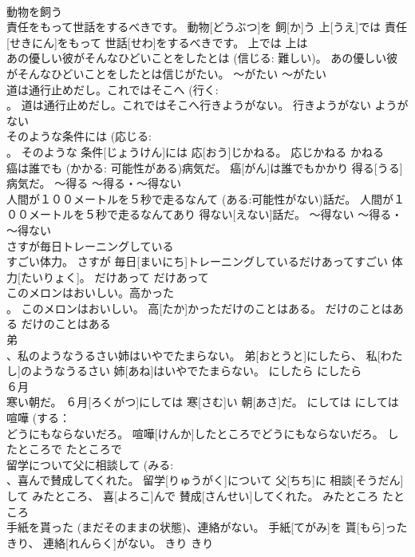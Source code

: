 \documentclass[8pt]{extreport}
\begin{document}
\begin{CJK}{UTF8}{min}
\\	動物を飼う 
\\	責任をもって世話をするべきです。	動物[どうぶつ]を 飼[か]う 上[うえ]では 責任[せきにん]をもって 世話[せわ]をするべきです。	上では	上は	
\\	あの優しい彼がそんなひどいことをしたとは (信じる: 難しい)。	あの優しい彼がそんなひどいことをしたとは信じがたい。	～がたい	～がたい	
\\	道は通行止めだし。これではそこへ (行く: 
\\	。	道は通行止めだし。これではそこへ行きようがない。	行きようがない	ようがない	
\\	そのような条件には (応じる: 
\\	。	そのような 条件[じょうけん]には 応[おう]じかねる。	応じかねる	かねる	
\\	癌は誰でも (かかる: 可能性がある)病気だ。	癌[がん]は誰でもかかり 得る[うる]病気だ。	～得る	～得る・～得ない	
\\	人間が１００メートルを５秒で走るなんて (ある:可能性がない)話だ。	人間が１００メートルを５秒で走るなんてあり 得ない[えない]話だ。	～得ない	～得る・～得ない	
\\	さすが毎日トレーニングしている 
\\	すごい体力。	さすが 毎日[まいにち]トレーニングしているだけあってすごい 体力[たいりょく]。	だけあって	だけあって	
\\	このメロンはおいしい。高かった 
\\	。	このメロンはおいしい。 高[たか]かっただけのことはある。	だけのことはある	だけのことはある	
\\	弟 
\\	、私のようなうるさい姉はいやでたまらない。	弟[おとうと]にしたら、 私[わたし]のようなうるさい 姉[あね]はいやでたまらない。	にしたら	にしたら	
\\	６月 
\\	寒い朝だ。	６月[ろくがつ]にしては 寒[さむ]い 朝[あさ]だ。	にしては	にしては	
\\	喧嘩 (する： 
\\	どうにもならないだろ。	喧嘩[けんか]したところでどうにもならないだろ。	したところで	たところで	
\\	留学について父に相談して (みる: 
\\	、喜んで賛成してくれた。	留学[りゅうがく]について 父[ちち]に 相談[そうだん]して みたところ、 喜[よろこ]んで 賛成[さんせい]してくれた。	みたところ	たところ	
\\	手紙を貰った (まだそのままの状態)、連絡がない。	手紙[てがみ]を 貰[もら]ったきり、 連絡[れんらく]がない。	きり	きり	

\end{CJK}
\end{document}
